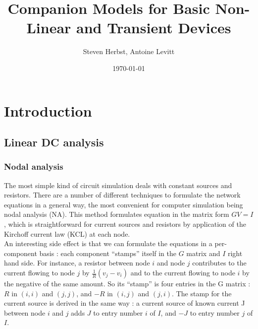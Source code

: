 \documentclass{article}
\begin{document}
\title{Companion Models for Basic Non-Linear and Transient Devices}
\author{Steven Herbst, Antoine Levitt}
\date{\today}

\maketitle

\section{Introduction}
\subsection{Linear DC analysis}
\subsubsection{Nodal analysis}
The most simple kind of circuit simulation deals with constant sources and resistors. There are a number of different techniques to formulate the network equations in a general way, the most convenient for computer simulation being nodal analysis (NA). This method formulates equation in the matrix form $GV = I$, which is straightforward for current sources and resistors by application of the Kirchoff current law (KCL) at each node.\\
An interesting side effect is that we can formulate the equations in a per-component basis : each component ``stamps'' itself in the $G$ matrix and $I$ right hand side. For instance, a resistor between node $i$ and node $j$ contributes to the current flowing to node $j$ by $\frac{1}{R} (v_j - v_i)$ and to the current flowing to node $i$ by the negative of the same amount. So its ``stamp'' is four entries in the G matrix : $R$ in $(i,i)$ and $(j,j)$, and $-R$ in $(i,j)$ and $(j,i)$. The stamp for the current source is derived in the same way : a current source of known current J between node $i$ and $j$ adds $J$ to entry number $i$ of $I$, and $-J$ to entry number $j$ of $I$.\\
\end{document}

